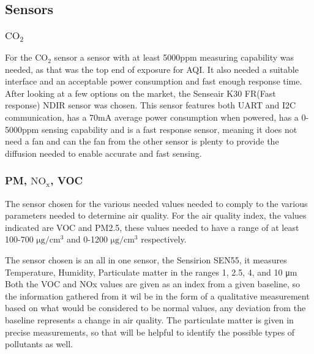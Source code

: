 \subsection{Sensors}
\subsubsection{$\mathrm{CO_2}$}
For the $\mathrm{CO_2}$ sensor a sensor with at least 5000ppm measuring capability was needed, as that was the top end of exposure for AQI. It also needed a suitable interface and an acceptable power consumption and fast enough response time.
After looking at a few options on the market, the Senseair K30 FR(Fast response) NDIR sensor was chosen. This sensor features both UART and I2C communication, has a 70mA average power consumption when powered, has a 0-5000ppm sensing capability and is a fast response sensor, meaning it does not need a fan and can the fan from the other sensor is plenty to provide the diffusion needed to enable accurate and fast sensing.
\subsubsection{PM, $\mathrm{NO_x}$, VOC}
The sensor chosen for the various needed values needed to comply to the various parameters needed to determine air quality. For the air quality index, the values indicated are VOC and PM2.5, these values needed to have a range of at least 100-700 $ \si{\micro\gram}/\si{\centi\meter^3} $ and 0-1200  $ \si{\micro\gram}/\si{\centi\meter^3} $ respectively.

\noindent
The sensor chosen is an all in one sensor, the Sensirion SEN55, it measures Temperature, Humidity, Particulate matter in the ranges 1, 2.5, 4, and 10 \si{\micro\meter}
Both the VOC and NOx values are given as an index from a given baseline, so the information gathered from it wil be in the form of a qualitative measurement based on what would be considered to be normal values, any deviation from the baseline represents a change in air quality. The particulate matter is given in precise measurements, so that will be helpful to identify the possible types of pollutants as well.




